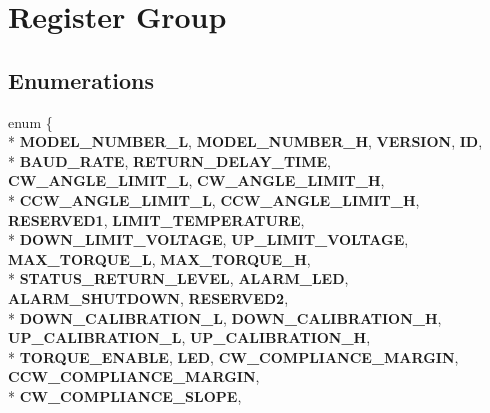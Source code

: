 \hypertarget{group__SREGISTER__GROUP}{}\section{Register Group}
\label{group__SREGISTER__GROUP}
\subsection*{Enumerations}
\begin{DoxyCompactItemize}
\item 
enum \{ \\*
{\bfseries M\+O\+D\+E\+L\+\_\+\+N\+U\+M\+B\+E\+R\+\_\+L}, 
{\bfseries M\+O\+D\+E\+L\+\_\+\+N\+U\+M\+B\+E\+R\+\_\+H}, 
{\bfseries V\+E\+R\+S\+I\+ON}, 
{\bfseries ID}, 
\\*
{\bfseries B\+A\+U\+D\+\_\+\+R\+A\+TE}, 
{\bfseries R\+E\+T\+U\+R\+N\+\_\+\+D\+E\+L\+A\+Y\+\_\+\+T\+I\+ME}, 
{\bfseries C\+W\+\_\+\+A\+N\+G\+L\+E\+\_\+\+L\+I\+M\+I\+T\+\_\+L}, 
{\bfseries C\+W\+\_\+\+A\+N\+G\+L\+E\+\_\+\+L\+I\+M\+I\+T\+\_\+H}, 
\\*
{\bfseries C\+C\+W\+\_\+\+A\+N\+G\+L\+E\+\_\+\+L\+I\+M\+I\+T\+\_\+L}, 
{\bfseries C\+C\+W\+\_\+\+A\+N\+G\+L\+E\+\_\+\+L\+I\+M\+I\+T\+\_\+H}, 
{\bfseries R\+E\+S\+E\+R\+V\+E\+D1}, 
{\bfseries L\+I\+M\+I\+T\+\_\+\+T\+E\+M\+P\+E\+R\+A\+T\+U\+RE}, 
\\*
{\bfseries D\+O\+W\+N\+\_\+\+L\+I\+M\+I\+T\+\_\+\+V\+O\+L\+T\+A\+GE}, 
{\bfseries U\+P\+\_\+\+L\+I\+M\+I\+T\+\_\+\+V\+O\+L\+T\+A\+GE}, 
{\bfseries M\+A\+X\+\_\+\+T\+O\+R\+Q\+U\+E\+\_\+L}, 
{\bfseries M\+A\+X\+\_\+\+T\+O\+R\+Q\+U\+E\+\_\+H}, 
\\*
{\bfseries S\+T\+A\+T\+U\+S\+\_\+\+R\+E\+T\+U\+R\+N\+\_\+\+L\+E\+V\+EL}, 
{\bfseries A\+L\+A\+R\+M\+\_\+\+L\+ED}, 
{\bfseries A\+L\+A\+R\+M\+\_\+\+S\+H\+U\+T\+D\+O\+WN}, 
{\bfseries R\+E\+S\+E\+R\+V\+E\+D2}, 
\\*
{\bfseries D\+O\+W\+N\+\_\+\+C\+A\+L\+I\+B\+R\+A\+T\+I\+O\+N\+\_\+L}, 
{\bfseries D\+O\+W\+N\+\_\+\+C\+A\+L\+I\+B\+R\+A\+T\+I\+O\+N\+\_\+H}, 
{\bfseries U\+P\+\_\+\+C\+A\+L\+I\+B\+R\+A\+T\+I\+O\+N\+\_\+L}, 
{\bfseries U\+P\+\_\+\+C\+A\+L\+I\+B\+R\+A\+T\+I\+O\+N\+\_\+H}, 
\\*
{\bfseries T\+O\+R\+Q\+U\+E\+\_\+\+E\+N\+A\+B\+LE}, 
{\bfseries L\+ED}, 
{\bfseries C\+W\+\_\+\+C\+O\+M\+P\+L\+I\+A\+N\+C\+E\+\_\+\+M\+A\+R\+G\+IN}, 
{\bfseries C\+C\+W\+\_\+\+C\+O\+M\+P\+L\+I\+A\+N\+C\+E\+\_\+\+M\+A\+R\+G\+IN}, 
\\*
{\bfseries C\+W\+\_\+\+C\+O\+M\+P\+L\+I\+A\+N\+C\+E\+\_\+\+S\+L\+O\+PE}, 

\end{DoxyCompactItemize}
